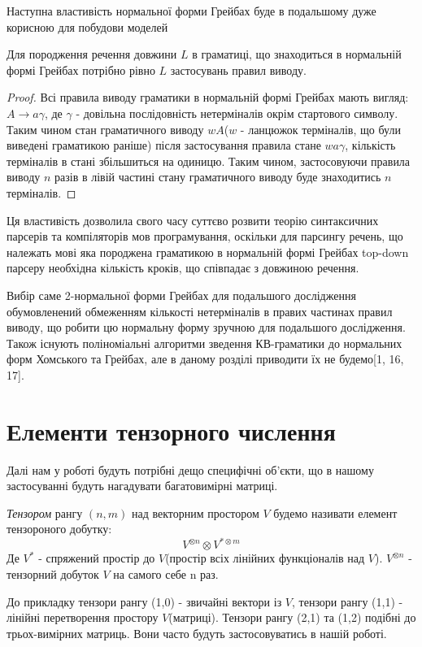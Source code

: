 Наступна властивість нормальної форми Грейбах буде в подальшому дуже корисною для побудови моделей
\begin{claim}
  Для породження речення довжини $L$ в граматиці, що знаходиться в нормальній формі Грейбах потрібно рівно $L$ застосувань правил виводу.
\end{claim}
\begin{proof}
  Всі правила виводу граматики в нормальній формі Грейбах мають вигляд: $ A \rightarrow a \gamma $, де $\gamma$ - довільна послідовність нетерміналів окрім стартового символу. Таким чином стан граматичного виводу $w A$($w$ - ланцюжок терміналів, що були виведені граматикою раніше) після застосування правила стане $w a \gamma$, кількість терміналів в стані збільшиться на одиницю. Таким чином, застосовуючи правила виводу $n$ разів в лівій частині стану граматичного виводу буде знаходитись $n$ терміналів.
\end{proof}

Ця властивість дозволила свого часу суттєво розвити теорію синтаксичних парсерів та компіляторів мов програмування, оскільки для парсингу речень, що належать мові яка породжена граматикою в нормальній формі Грейбах top-down парсеру необхідна кількість кроків, що співпадає з довжиною речення.

Вибір саме 2-нормальної форми Грейбах для подальшого дослідження обумовленений обмеженням кількості нетерміналів в правих частинах правил виводу, що робити цю нормальну форму зручною для подальшого дослідження.
Також існують поліноміальні алгоритми зведення КВ-граматики до нормальних форм Хомського та Грейбах, але в даному розділі приводити їх не будемо[1, 16, 17].
\section{Елементи тензорного числення}
Далі нам у роботі будуть потрібні дещо специфічні об'єкти, що в нашому застосуванні будуть нагадувати багатовимірні матриці.
\begin{definition}
\textit{Тензором} рангу $(n,m)$ над векторним простором $V$ будемо називати елемент тензороного добутку:
$$ V^{\otimes n} \otimes V^{*\otimes m} $$
Де $V^*$ - спряжений простір до $V$(простір всіх лінійних функціоналів над $V$). $V^{\otimes n}$ - тензорний добуток $V$ на самого себе n раз.
\end{definition}
До прикладку тензори рангу (1,0) - звичайні вектори із $V$, тензори рангу (1,1) - лінійні перетворення простору $V$(матриці). Тензори рангу (2,1) та (1,2) подібні до трьох-вимірних матриць. Вони часто будуть застосовуватись в нашій роботі.

